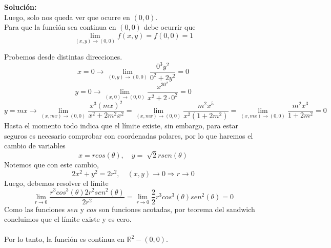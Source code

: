 \documentclass[12pt]{article}
\newenvironment{solucion}
{\begin{mdframed}[backgroundcolor=black!10]
		{\bf Solución:}\\
	}
	{
	\end{mdframed}
}
\newenvironment{preguntas}
{\begin{enumerate}\itemsep12pt
	}
	{
	\end{enumerate}
}
\newcommand{\ra}{\rightarrow}
\newcommand{\R}{\mathbb{R}}
\begin{document}
\begin{preguntas}
\begin{solucion}
Luego, solo nos queda ver que ocurre en $(0,0)$.\\

Para que la función sea continua en $(0,0)$ debe ocurrir que 
$$\lim\limits_{(x,y) \to (0,0)} f(x,y) = f(0,0) = 1$$
			
			Probemos desde distintas direcciones.
$$x = 0 \ra \lim\limits_{(0,y) \to (0,0)} \dfrac{0^3y^2}{0^2+2y^2} = 0$$
$$y = 0 \ra \lim\limits_{(x,0) \to (0,0)} \dfrac{x^30^2}{x^2+2\cdot 0^2} = 0$$
$$y = mx \ra \lim\limits_{(x,mx) \to (0,0)} \dfrac{x^3 (mx)^2}{x^2+2m^2x^2}
= \lim\limits_{(x,mx) \to (0,0)} \dfrac{m^2x^5}{x^2(1+2m^2)}
= \lim\limits_{(x,mx) \to (0,0)} \dfrac{m^2x^3}{1+2m^2} = 0$$
			Hasta el momento todo indica que el límite existe, sin embargo, para estar seguros es necesario comprobar con coordenadas polares, por lo que haremos el cambio de variables
$$x = rcos(\theta), \quad y = \sqrt[]{2}rsen(\theta)$$
Notemos que con este cambio,
$$2x^2+y^2 = 2r^2, \quad (x,y)\ra 0 \Longrightarrow r \ra 0$$
Luego, debemos resolver el límite
$$\lim\limits_{r\ra 0} \dfrac{r^3cos^3(\theta)2r^2sen^2(\theta)}{2r^2}
			= \lim\limits_{r\ra 0} \dfrac{2}{2}r^3cos^3(\theta)sen^2(\theta) = 0$$
			Como las funciones $sen$ y $cos$ son funciones acotadas, por teorema del sandwich concluimos que el límite existe y es cero.\\
\\
Por lo tanto, la función es continua en $\R^2 - (0,0)$.
\end{solucion}
\end{preguntas}
\end{document}
